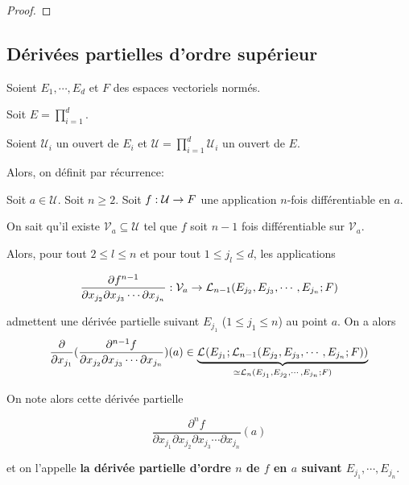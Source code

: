 \ifdefined\outputproof
\begin{proof}

\end{proof}
\fi

\subsection{Dérivées partielles d'ordre supérieur}

Soient $E_{1}, \cdots, E_{d}$ et $F$ des espaces vectoriels normés.

Soit $E = \displaystyle \prod_{i = 1}^{d}$.

Soient $\mathcal{U}_{i}$ un ouvert de $E_{i}$ et $\mathcal{U} = \displaystyle
\prod_{i = 1}^{d} \mathcal{U}_{i}$ un ouvert de $E$.

Alors, on définit par récurrence:

\begin{definition}
	Soit $a \in \mathcal{U}$.
	Soit $n \geq 2$. Soit $\GSfunction{f}{\mathcal{U}}{F}$ une application
	$n$-fois différentiable en $a$.

	On sait qu'il existe $\mathcal{V}_{a} \subseteq \mathcal{U}$ tel que $f$
	soit $n - 1$ fois différentiable sur $\mathcal{V}_{a}$.

	Alors, pour tout $2 \leq l \leq n$ et pour tout $1 \leq j_{l} \leq d$, les
	applications

	\begin{equation*}
		\frac{\partial f^{n - 1}}{\partial x_{j_{2}} \partial x_{j_{3}} \cdots
		\partial x_{j_{n}}} : \mathcal{V}_{a} \rightarrow \GScontinueHomo[n -
		1]{E_{j_{2}}, E_{j_{3}}, \cdots, E_{j_{n}}}{F}
	\end{equation*}

	admettent une dérivée partielle suivant $E_{j_{1}}$ ($1 \leq j_{1} \leq
	n$) au point $a$. On a alors
	\begin{equation*}
		\frac{\partial}{\partial x_{j_{1}}} (
		\frac{\partial^{n - 1} f}{\partial x_{j_{2}} \partial x_{j_{3}} \cdots
		\partial x_{j_{n}}}) (a) \in
		\underbrace{\GScontinueHomo{E_{j_{1}}}{\GScontinueHomo[n -
		1]{E_{j_{2}}, E_{j_{3}}, \cdots, E_{j_{n}}}{F}}}_{\isomorph
			\GScontinueHomo[n]{E_{j_{1}}, E_{j_{2}}, \cdots, E_{j_{n}}}{F}}
	\end{equation*}

	On note alors cette dérivée partielle

	\begin{equation*}
		\frac{\partial^{n} f}{\partial x_{j_{1}} \partial x_{j_{2}} \partial x_{j_{3}} \cdots
		\partial x_{j_{n}}} (a)
	\end{equation*}

	et on l'appelle \textbf{la dérivée partielle d'ordre $n$ de $f$ en $a$
		suivant $E_{j_{1}}, \cdots, E_{j_{n}}$}.
\end{definition}

